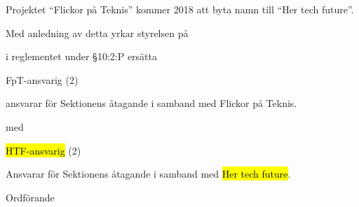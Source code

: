 \documentclass[../_main/handlingar.tex]{subfiles}
\begin{document}
Projektet ``Flickor på Teknis'' kommer 2018 att byta namn till ``Her tech future''.

Med anledning av detta yrkar styrelsen på
\begin{attsatser}
    \att i reglementet under \S10:2:P ersätta\par
        FpT-ansvarig (2)
        \begin{tightdashlist}
            \item ansvarar för Sektionens åtagande i samband med Flickor på Teknis.
        \end{tightdashlist}
        med

          \hl{HTF-ansvarig} (2)
          \begin{tightdashlist}
              \item Ansvarar för Sektionens åtagande i samband med \hl{Her tech future}.
          \end{tightdashlist}
\end{attsatser}

\begin{signatures}{1}
    \ist
    \signature{\ordf}{Ordförande}
\end{signatures}
\end{document}
